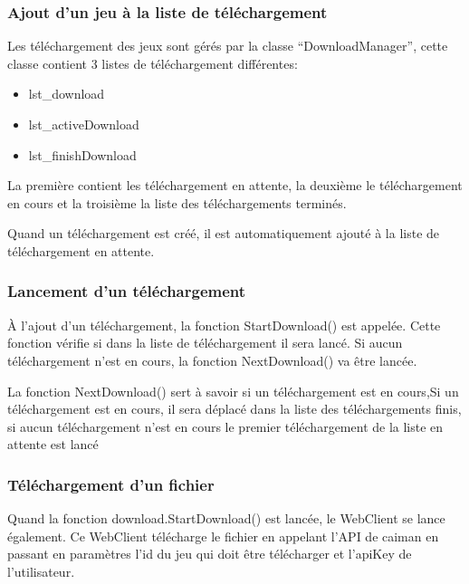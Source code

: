 \documentclass[a4paper,12pt,french]{sphinxmanual}
\begin{document}
\subsubsection{Ajout d’un jeu à la liste de téléchargement}
\label{\detokenize{organique:ajout-dun-jeu-a-la-liste-de-telechargement}}
\sphinxAtStartPar
Les téléchargement des jeux sont gérés par la classe “DownloadManager”, cette classe contient 3 listes de téléchargement différentes:
\begin{itemize}
\item {} 
\sphinxAtStartPar
lst\_download

\item {} 
\sphinxAtStartPar
lst\_activeDownload

\item {} 
\sphinxAtStartPar
lst\_finishDownload

\end{itemize}

\sphinxAtStartPar
La première contient les téléchargement en attente, la deuxième le téléchargement en cours et la troisième la liste des téléchargements terminés.

\sphinxAtStartPar
Quand un téléchargement est créé, il est automatiquement ajouté à la liste de téléchargement en attente.


\subsubsection{Lancement d’un téléchargement}
\label{\detokenize{organique:lancement-dun-telechargement}}
\sphinxAtStartPar
À l’ajout d’un téléchargement, la fonction StartDownload() est appelée. Cette fonction vérifie si dans la liste de téléchargement il sera lancé. Si aucun téléchargement n’est en cours, la fonction NextDownload() va être lancée.

\sphinxAtStartPar
La fonction NextDownload() sert à savoir si un téléchargement est en cours,Si un téléchargement est en cours, il sera déplacé dans la liste des téléchargements finis, si aucun téléchargement n’est en cours le premier téléchargement de la liste en attente est lancé


\subsubsection{Téléchargement d’un fichier}
\label{\detokenize{organique:telechargement-dun-fichier}}
\sphinxAtStartPar
Quand la fonction download.StartDownload() est lancée, le WebClient se lance également. Ce WebClient télécharge le fichier en appelant l’API de caiman en passant en paramètres l’id du jeu qui doit être télécharger et l’apiKey de l’utilisateur.
\end{document}
